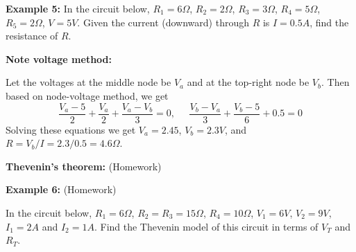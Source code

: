 \documentclass{article}
\begin{document}
{\bf Example 5:} In the circuit below, $R_1=6\Omega$, $R_2=2\Omega$,
$R_3=3\Omega$, $R_4=5\Omega$, $R_5=2\Omega$, $V=5V$. Given the current 
(downward) through $R$ is $I=0.5A$, find the resistance of $R$.


{\bf Note voltage method:}

Let the voltages at the middle node be $V_a$ and at the top-right node 
be $V_b$. Then based on node-voltage method, we get
\begin{equation}
  \frac{V_a-5}{2}+\frac{V_a}{2}+\frac{V_a-V_b}{3}=0,\;\;\;\;\;
  \frac{V_b-V_a}{3}+\frac{V_b-5}{6}+0.5=0
\end{equation}
Solving these equations we get $V_a=2.45$, $V_b=2.3V$, and
$R=V_b/I=2.3/0.5=4.6\Omega$.

{\bf Thevenin's theorem:} (Homework)


\begin{comment}
Remove $R$ as the load, model the rest of the circuit as a non-ideal
Thevenin model in terms of $R_T$ and $V_T$. To find $R_T$, we short $V$
and find:
\begin{equation}
  R_T=R_1||(R_3+R_2||R_5)=6||(3+2||2)=6||4=2.4\,\Omega
\end{equation}
To find $V_T$, we first find $V_5$ across $R_5$:
\begin{equation}
  V_5=V\frac{R_5}{R_5+R_2||(R_1+R_3)}=5 \frac{2}{2+2||9}=2.75\,V
\end{equation}
$V_2$ across $R_2$:
\begin{equation}
  V_5=V\frac{R_2||(R_1+R_3)}{R_5+R_2||(R_1+R_3)}=5 \frac{2}{2+2||9}=2.25\,V
\end{equation}
$V_3$ across $R_3$:
\begin{equation}
  V_3=V_2\frac{R_3}{R_1+R_3}=2.25\frac{3}{3+6}=0.75
\end{equation}
Now we get $V_T=V_3+V_5=3.5$. To get $R$ so that the current through it is
$I=0.5$, we solve the equation based on the Thevenin model
\begin{equation}
  \frac{V_T}{R_T+R}=\frac{3.5}{2.4+R}=0.5
\end{equation}
and get $R=4.6\,\Omega$.
\end{comment}

{\bf Example 6:}  (Homework)

In the circuit below, $R_1=6\Omega$, $R_2=R_3=15\Omega$, $R_4=10\Omega$, $V_1=6V$,
$V_2=9V$, $I_1=2A$ and $I_2=1A$. Find the Thevenin model of this circuit in terms
of $V_T$ and $R_T$. 
\end{document}

